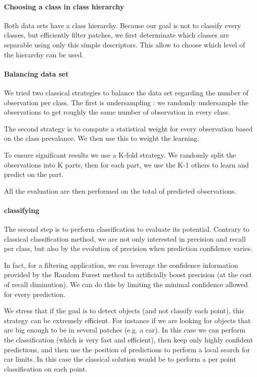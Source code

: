 			\paragraph{Choosing a class in class hierarchy}
				Both data sets have a class hierarchy. Because our goal is not to classify every classes, but efficiently filter patches, we first determinate which classes are separable using only this simple descriptors. 
				This allow to choose which level of the hierarchy can be used.
				
			\paragraph{Balancing data set}
				We tried two classical strategies to balance the data set regarding the number of observation per class.
				The first is undersampling : we randomly undersample the observations to get roughly the same number of observation in every class.
				
				The second strategy is to compute a statistical weight for every observation based on the class prevalance. 
				We then use this to weight the learning.
				
				To ensure significant results we use a K-fold strategy. 
				We randomly split the observations into K parts, then for each part, we use the K-1 others to learn and predict on the part.
				
				All the evaluation are then performed on the total of predicted observations.
				
			\paragraph{classifying}
				
				The second step is to perform classification to evaluate its potential.
				Contrary to classical classification method, we are not only interested in precision and recall per class, but also by the evolution of precision when prediction confidence varies.
				
				In fact, for a filtering application, we can leverage the confidence information provided by the Random Forest method to artificially boost precision (at the cost of recall diminution). We can do this by limiting the minimal confidence allowed for every prediction.
			 	
			 	We stress that if the goal is to detect objects (and not classify each point), this strategy can be extremely efficient.
			 	For instance if we are looking for objects that are big enough to be in several patches (e.g. a car).
			 	In this case we can perform the classification (which is very fast and efficient), then keep only highly confident predictions, and then use the position of predictions to perform a local search for car limits.
			 	In this case the classical solution would be to perform a per point classification on each point.
			 	
